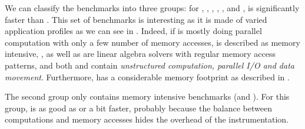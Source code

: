 We can classify the benchmarks into three groups:
for \BT, \CG, \DC,  \EP, \LU, \SP and \UA, \Moca is
significantly faster than \TABARNAC. This set of benchmarks is interesting as
it is made of varied application profiles as we can see in .
Indeed, if \EP is mostly doing parallel computation with only a few number of
memory accesses, \CG is described as memory intensive,
\BT, \LU as well as \SP are linear algebra solvers with regular memory access patterns,
and both \UA and \DC contain \emph{unstructured computation,
parallel I/O and data movement}. Furthermore, \DC has a considerable memory footprint as
described in .

The second group only contains memory intensive benchmarks (\FT and
\IS). For this group, \Moca is as good as \TABARNAC or a bit faster, probably
because the balance between computations and memory accesses hides the
overhead of the instrumentation.

